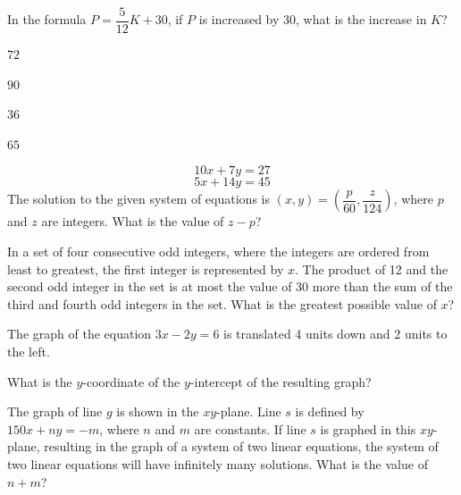 \noindent\begin{minipage}{\linewidth}
\par\smallskip
In the formula $P=\dfrac{5}{12}K+30$, if $P$ is increased by 30, what is the increase in $K$?
\begin{satchoices}
  \item[A)] $72$
  \item[B)] $90$
  \item[C)] $36$
  \item[D)] $65$
\end{satchoices}
\end{minipage}
\vfill
\noindent\begin{minipage}{\linewidth}
\par\smallskip
$$10x+7y=27$$ $$5x+14y=45$$ The solution to the given system of equations is $(x,y)=\left(\dfrac{p}{60},\dfrac{z}{124}\right)$, where $p$ and $z$ are integers. What is the value of $z-p$?
\end{minipage}
\vfill
\noindent\begin{minipage}{\linewidth}
\par\smallskip
In a set of four consecutive odd integers, where the integers are ordered from least to greatest, the first integer is represented by $x$. The product of 12 and the second odd integer in the set is at most the value of 30 more than the sum of the third and fourth odd integers in the set. What is the greatest possible value of $x$?
\end{minipage}
\vfill
\clearpage
\noindent\begin{minipage}{\linewidth}
\par\smallskip
The graph of the equation $3x-2y=6$ is translated 4 units down and 2 units to the left.\par\smallskip What is the $y$-coordinate of the $y$-intercept of the resulting graph?
\end{minipage}
\vfill
\noindent\begin{minipage}{\linewidth}
\par\smallskip
The graph of line $g$ is shown in the $xy$-plane. Line $s$ is defined by $150x+ny=-m$, where $n$ and $m$ are constants. If line $s$ is graphed in this $xy$-plane, resulting in the graph of a system of two linear equations, the system of two linear equations will have infinitely many solutions. What is the value of $n+m$?
\satfig{\figlineg}
\end{minipage}
